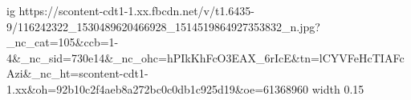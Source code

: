  
 
 
 
 

\par
\ifcmt
  ig https://scontent-cdt1-1.xx.fbcdn.net/v/t1.6435-9/116242322_1530489620466928_1514519864927353832_n.jpg?_nc_cat=105&ccb=1-4&_nc_sid=730e14&_nc_ohc=hPIkKhFcO3EAX_6rIcE&tn=lCYVFeHcTIAFcAzi&_nc_ht=scontent-cdt1-1.xx&oh=92b10c2f4aeb8a272bc0c0db1c925d19&oe=61368960
  width 0.15
\fi
